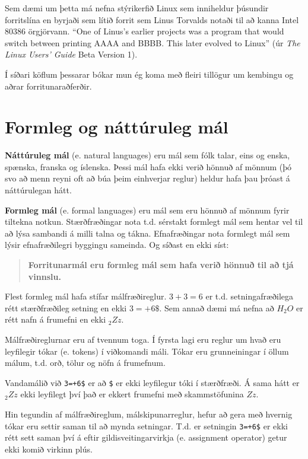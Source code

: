 Sem dæmi um þetta má nefna stýrikerfið Linux sem inniheldur þúsundir forritslína en byrjaði sem lítið forrit sem Linus Torvalds notaði til að kanna Intel 80386 örgjörvann.
``One of Linus's earlier projects was a program that would switch between printing AAAA and BBBB.
This later evolved to Linux'' (úr {\em The Linux Users' Guide} Beta Version 1).


Í síðari köflum þessarar bókar mun ég koma með fleiri tillögur um kembingu og aðrar forritunaraðferðir.

\section{Formleg og náttúruleg mál}
\label{formal}

{\bf Náttúruleg mál} (e. natural languages) eru mál sem fólk talar, eins og enska, spænska, franska og íslenska.
Þessi mál hafa ekki verið hönnuð af mönnum (þó svo að menn reyni oft að búa þeim einhverjar reglur) heldur hafa þau þróast á náttúrulegan hátt.

{\bf Formleg mál} (e. formal languages) eru mál sem eru hönnuð af mönnum fyrir tiltekna notkun.
Stærðfræðingar nota t.d. sérstakt formlegt mál sem hentar vel til að lýsa sambandi á milli talna og tákna.
Efnafræðingar nota formlegt mál sem lýsir efnafræðilegri byggingu sameinda.
Og síðast en ekki síst:

\begin{quote}
{\bf Forritunarmál eru formleg mál sem hafa verið hönnuð til að tjá vinnslu.} 
\end{quote}

Flest formleg mál hafa stífar málfræðireglur.
$3+3=6$ er t.d. setningafræðilega rétt stærðfræðileg setning en ekki $3=+6\$$.
Sem annað dæmi má nefna að $H_2O$ er rétt nafn á frumefni en ekki $_2Zz$.

Málfræðireglurnar eru af tvennum toga.
Í fyrsta lagi eru reglur um hvað eru leyfilegir tókar (e. tokens) í viðkomandi máli. 
Tókar eru grunneiningar í öllum málum, t.d. orð, tölur og nöfn á frumefnum.

Vandamálið við {\tt 3=+6\$} er að {\tt \$} er ekki leyfilegur tóki í stærðfræði.
Á sama hátt er $_2Zz$ ekki leyfilegt því það er ekkert frumefni með skammstöfunina $Zz$.

Hin tegundin af málfræðireglum, málskipunarreglur, hefur að gera með hvernig tókar eru settir saman til að mynda setningar.
T.d. er setningin {\tt 3=+6\$} er ekki rétt sett saman því á eftir gildisveitingarvirkja (e. assignment operator) getur ekki komið virkinn plús.

